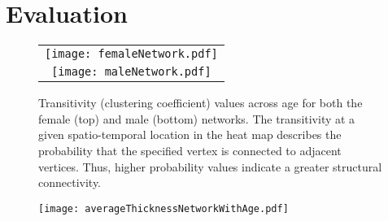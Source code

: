 \section{Evaluation}


\begin{figure*}
  \centering
  \begin{tabular}{c}
  \texttt{[image: femaleNetwork.pdf]} \\
  \texttt{[image: maleNetwork.pdf]}
  \end{tabular}
  \caption{Transitivity (clustering coefficient) values across age for both the female (top)
  and male (bottom) networks.  The transitivity at a given spatio-temporal
  location in the heat map describes the probability that the specified 
  vertex is connected to adjacent vertices.  Thus, higher probability values indicate a
  greater structural connectivity.
  }
  \label{fig:network}
\end{figure*}

\begin{figure}
  \centering
  \texttt{[image: averageThicknessNetworkWithAge.pdf]}
  \caption{ 
  }
  \label{fig:corr_vs_age}
\end{figure}



